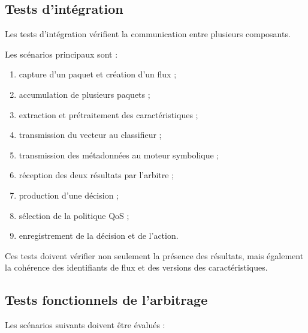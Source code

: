 \subsection{Tests d'intégration}

Les tests d'intégration vérifient la communication entre plusieurs composants.

Les scénarios principaux sont :

\begin{enumerate}
    \item capture d'un paquet et création d'un flux ;
    \item accumulation de plusieurs paquets ;
    \item extraction et prétraitement des caractéristiques ;
    \item transmission du vecteur au classifieur ;
    \item transmission des métadonnées au moteur symbolique ;
    \item réception des deux résultats par l'arbitre ;
    \item production d'une décision ;
    \item sélection de la politique QoS ;
    \item enregistrement de la décision et de l'action.
\end{enumerate}

Ces tests doivent vérifier non seulement la présence des résultats, mais également la cohérence des identifiants de flux et des versions des caractéristiques.

\subsection{Tests fonctionnels de l'arbitrage}

Les scénarios suivants doivent être évalués :

